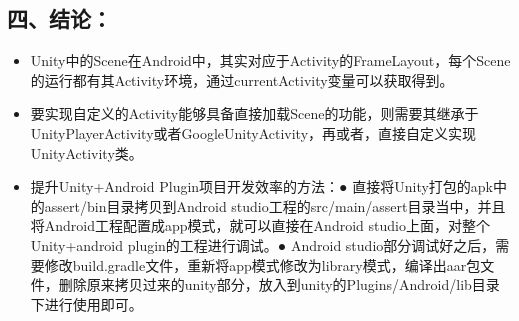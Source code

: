 \documentclass[9pt, b5paper]{article}
\begin{document}
\subsection{四、结论：}
\label{sec-1-6}
\begin{itemize}
\item Unity中的Scene在Android中，其实对应于Activity的FrameLayout，每个Scene的运行都有其Activity环境，通过currentActivity变量可以获取得到。
\item 要实现自定义的Activity能够具备直接加载Scene的功能，则需要其继承于UnityPlayerActivity或者GoogleUnityActivity，再或者，直接自定义实现UnityActivity类。
\item 提升Unity+Android Plugin项目开发效率的方法：● 直接将Unity打包的apk中的assert/bin目录拷贝到Android studio工程的src/main/assert目录当中，并且将Android工程配置成app模式，就可以直接在Android studio上面，对整个Unity+android plugin的工程进行调试。● Android studio部分调试好之后，需要修改build.gradle文件，重新将app模式修改为library模式，编译出aar包文件，删除原来拷贝过来的unity部分，放入到unity的Plugins/Android/lib目录下进行使用即可。
\end{itemize}
\end{document}
